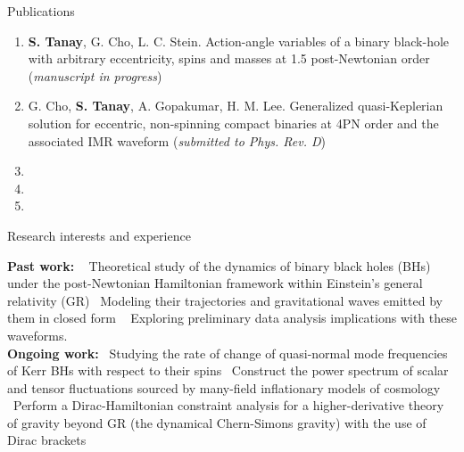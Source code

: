 \documentclass{resume} %
\begin{document}
\begin{rSection}{Publications}
  \begin{enumerate}
  	\item \textbf{S. Tanay}, G. Cho, L. C. Stein. Action-angle variables of a binary black-hole with arbitrary eccentricity, spins and
masses at 1.5 post-Newtonian order (\textit{manuscript in progress})
  	\item G. Cho, \textbf{S. Tanay}, A. Gopakumar, H. M. Lee. Generalized quasi-Keplerian solution for eccentric, non-spinning compact binaries at
4PN order and the associated IMR waveform (\textit{submitted to Phys. Rev. D})
    \item {}
    \item {}
    \item {}
  \end{enumerate}
  \end{rSection}



 

\begin{rSection}{Research interests and experience}

\textbf{Past work:} \textbullet ~ Theoretical study of the dynamics of binary black holes (BHs) under the post-Newtonian Hamiltonian framework within
Einstein's general relativity (GR) \textbullet ~Modeling their trajectories and gravitational waves emitted by them in closed form \textbullet ~ Exploring
preliminary data analysis implications with these waveforms. \\
\textbf{Ongoing work:} \textbullet ~Studying the rate of change of quasi-normal mode frequencies of Kerr BHs with respect to their spins
 \textbullet ~Construct the power spectrum of scalar and tensor fluctuations sourced by many-field inflationary models of cosmology
 \textbullet ~Perform a Dirac-Hamiltonian constraint analysis for a higher-derivative theory of gravity beyond GR (the dynamical Chern-Simons gravity)
with the use of Dirac brackets

\end{rSection} 
  
  
  \pagebreak
 
   
\end{document}
